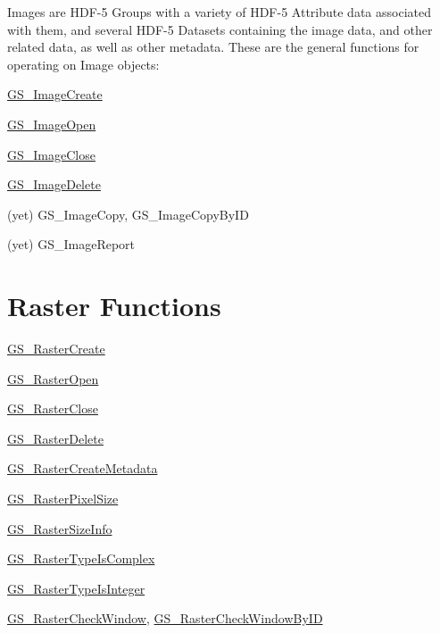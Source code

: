 Images are H\+D\+F-\/5 Groups with a variety of H\+D\+F-\/5 Attribute data associated with them, and several H\+D\+F-\/5 Datasets containing the image data, and other related data, as well as other metadata. These are the general functions for operating on Image objects\+: \begin{DoxyItemize}
\item \hyperlink{hdf5mine_8h_a6aebc2231c887d1bec1f10e361e649d9}{G\+S\+\_\+\+Image\+Create} \item \hyperlink{hdf5mine_8h_a461ac5bcc8e05be64b6b23e75872f968}{G\+S\+\_\+\+Image\+Open} \item \hyperlink{hdf5mine_8h_a6ef1e3e30b14e4f698d89a88e86a5ffa}{G\+S\+\_\+\+Image\+Close} \item \hyperlink{hdf5mine_8h_a869dadbfd60acbc69f13fd88f202d4cc}{G\+S\+\_\+\+Image\+Delete} \item (yet) G\+S\+\_\+\+Image\+Copy, G\+S\+\_\+\+Image\+Copy\+By\+I\+D \item (yet) G\+S\+\_\+\+Image\+Report\end{DoxyItemize}
\hypertarget{hdf_library_raster_functions}{}\section{Raster Functions}\label{hdf_library_raster_functions}
\begin{DoxyItemize}
\item \hyperlink{hdf5mine_8h_a895023bd9cb5070686c7bcd0159e2133}{G\+S\+\_\+\+Raster\+Create} \item \hyperlink{hdf5mine_8h_ab4ba5f75f8d6bf779f23430b76da74fc}{G\+S\+\_\+\+Raster\+Open} \item \hyperlink{hdf5mine_8h_a97858319e71528313dd92f9ad9c57ea3}{G\+S\+\_\+\+Raster\+Close} \item \hyperlink{hdf5mine_8h_a8483fc8490257c640e33fc5319fda77a}{G\+S\+\_\+\+Raster\+Delete} \item \hyperlink{hdf5mine_8h_ac7714264d1498aea1116d15229f0cbed}{G\+S\+\_\+\+Raster\+Create\+Metadata} \item \hyperlink{hdf5mine_8h_a66829cf51f9c3d01819df25398b23620}{G\+S\+\_\+\+Raster\+Pixel\+Size} \item \hyperlink{hdf5mine_8h_ae7010dc876746d014471d099ba5c0518}{G\+S\+\_\+\+Raster\+Size\+Info} \item \hyperlink{hdf5mine_8h_a8ee578c235946d66f642cbe73994b0d3}{G\+S\+\_\+\+Raster\+Type\+Is\+Complex} \item \hyperlink{hdf5mine_8h_aebd816f444724c60d4ac08d96b1b6371}{G\+S\+\_\+\+Raster\+Type\+Is\+Integer} \item \hyperlink{hdf5mine_8h_aad432d0513d576bfa0204514a58da96d}{G\+S\+\_\+\+Raster\+Check\+Window}, \hyperlink{hdf5mine_8h_a92c52acc14a0fd4566b4c2c50f33322a}{G\+S\+\_\+\+Raster\+Check\+Window\+By\+I\+D}\end{DoxyItemize}

